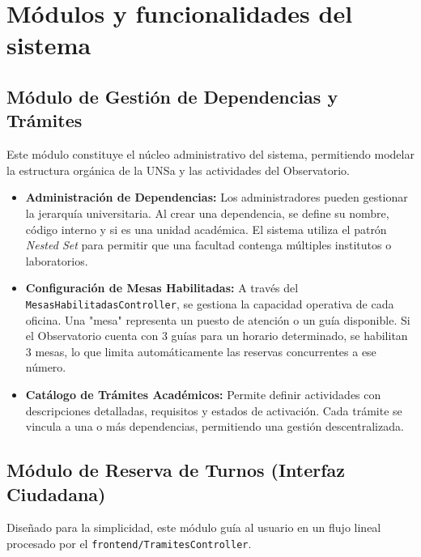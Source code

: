\chapter{Módulos y funcionalidades del sistema}

\section{Módulo de Gestión de Dependencias y Trámites}
Este módulo constituye el núcleo administrativo del sistema, permitiendo modelar la estructura orgánica de la UNSa y las actividades del Observatorio.

\begin{itemize}
    \item \textbf{Administración de Dependencias:} Los administradores pueden gestionar la jerarquía universitaria. Al crear una dependencia, se define su nombre, código interno y si es una unidad académica. El sistema utiliza el patrón \textit{Nested Set} para permitir que una facultad contenga múltiples institutos o laboratorios.
    \item \textbf{Configuración de Mesas Habilitadas:} A través del \texttt{MesasHabilitadasController}, se gestiona la capacidad operativa de cada oficina. Una "mesa" representa un puesto de atención o un guía disponible. Si el Observatorio cuenta con 3 guías para un horario determinado, se habilitan 3 mesas, lo que limita automáticamente las reservas concurrentes a ese número.
    \item \textbf{Catálogo de Trámites Académicos:} Permite definir actividades con descripciones detalladas, requisitos y estados de activación. Cada trámite se vincula a una o más dependencias, permitiendo una gestión descentralizada.
\end{itemize}

\section{Módulo de Reserva de Turnos (Interfaz Ciudadana)}
Diseñado para la simplicidad, este módulo guía al usuario en un flujo lineal procesado por el \texttt{frontend/TramitesController}.

